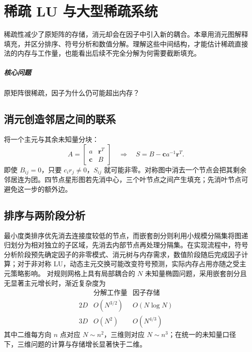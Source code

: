 \chapter{稀疏 LU 与大型稀疏系统}\label{v0ch:5}
\begin{chaptersummary}
稀疏性减少了原矩阵的存储，消元却会在因子中引入新的耦合。本章用消元图解释填充，并区分排序、符号分析和数值分解。理解这些中间结构，才能估计稀疏直接法的内存与工作量，也能看出后续不完全分解为何需要截断填充。
\end{chaptersummary}
\paragraph{核心问题}原矩阵很稀疏，因子为什么仍可能超出内存？

\section{消元创造邻居之间的联系}
将一个主元与其余未知量分块：
\[
 A=\begin{bmatrix}a&\bm r^T\\\bm c&B\end{bmatrix}
 \quad\Rightarrow\quad
 S=B-\bm c a^{-1}\bm r^T.
\]
即使 $B_{ij}=0$，只要 $c_i r_j\ne0$，$S_{ij}$ 就可能非零。对称图中消去一个节点会把其剩余邻居连为团。四节点星形图若先消中心，三个叶节点之间产生填充；先消叶节点可避免这一步的额外边。
\section{排序与两阶段分析}
最小度类排序优先消去连接度较低的节点，而嵌套剖分则利用小规模分隔集将图递归划分为相对独立的子区域，先消去内部节点再处理分隔集。在实现流程中，符号分析阶段预先确定因子的非零模式、消元树与内存需求，数值阶段随后完成因子计算；对于非对称 LU，动态主元交换可能改变符号预测，实际内存占用亦随之受主元策略影响。
对规则网格上具有局部耦合的 $N$ 未知量椭圆问题，采用嵌套剖分且无显著主元增长时，渐近复杂度为
\[
\begin{array}{c|cc}
 &\text{分解工作量}&\text{因子存储}\\\hline
2D&O(N^{3/2})&O(N\log N)\\
3D&O(N^2)&O(N^{4/3})
\end{array}
\]
其中二维每方向 $n$ 点对应 $N\sim n^2$，三维则对应 $N\sim n^3$；在统一的未知量口径下，三维问题的计算与存储增长显著快于二维。
